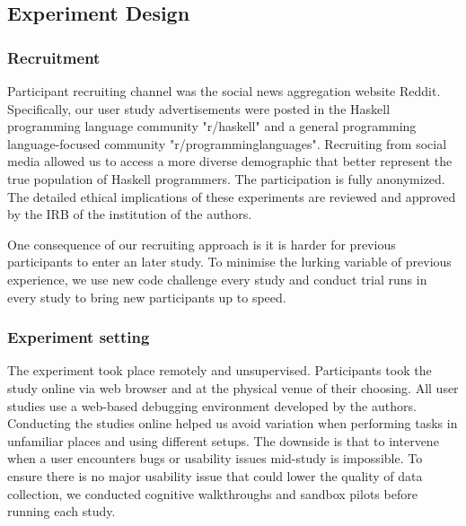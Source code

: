 \subsection{Experiment Design}
\subsubsection*{\textbf{Recruitment}}

Participant recruiting channel was the social news aggregation website Reddit. Specifically, our user study advertisements were posted in the Haskell programming language community "r/haskell" and a general programming language-focused community "r/programminglanguages". Recruiting from social media allowed us to access a more diverse demographic that better represent the true population of Haskell programmers. The participation is fully anonymized. The detailed ethical implications of these experiments are reviewed and approved by the IRB of the institution of the authors.

One consequence of our recruiting approach is it is harder for previous participants to enter an later study. To minimise the lurking variable of previous experience, we use new code challenge every study and conduct trial runs in every study to bring new participants up to speed.

\subsubsection*{\textbf{Experiment setting}}
The experiment took place remotely and unsupervised. Participants took the study online via web browser and at the physical venue of their choosing. All user studies use a web-based debugging environment developed by the authors. Conducting the studies online helped us avoid variation when performing tasks in unfamiliar places and using different setups. The downside is that to intervene when a user encounters bugs or usability issues mid-study is impossible. To ensure there is no major usability issue that could lower the quality of data collection, we conducted cognitive walkthroughs and sandbox pilots before running each study.

